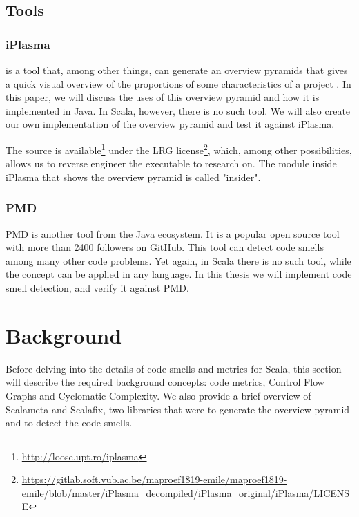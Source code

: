\documentclass[onecolumn]{article}
\let\oldsection\section
\renewcommand\section{\clearpage\oldsection}
\begin{document}
\subsection{Tools}


\subsubsection{iPlasma} \label{tool_iplasma}
is a tool that, among other things, can generate an overview pyramids that gives a quick visual overview of the proportions of some characteristics of a project \cite{Marinescu05iplasma}. In this paper, we will discuss the uses of this overview pyramid and how it is implemented in Java. In Scala, however, there is no such tool. We will also create our own implementation of the overview pyramid and test it against iPlasma.

The source is available\footnote{\url{http://loose.upt.ro/iplasma}} under the LRG license\footnote{\url{https://gitlab.soft.vub.ac.be/maproef1819-emile/maproef1819-emile/blob/master/iPlasma_decompiled/iPlasma_original/iPlasma/LICENSE}}, which, among other possibilities, allows us to reverse engineer the executable to research on. The module inside iPlasma that shows the overview pyramid is called "insider".


\subsubsection{PMD} \label{tool_pmd}
PMD is another tool from the Java ecosystem. It is a popular open source tool with more than 2400 followers on GitHub. This tool can detect code smells among many other code problems. Yet again, in Scala there is no such tool, while the concept can be applied in any language. In this thesis we will implement code smell detection, and verify it against PMD.



\section{Background}
Before delving into the details of code smells and metrics for Scala, this section will describe the required background concepts: code metrics, Control Flow Graphs and Cyclomatic Complexity. We also provide a brief overview of Scalameta and Scalafix, two libraries that were to generate the overview pyramid and to detect the code smells.
\end{document}
